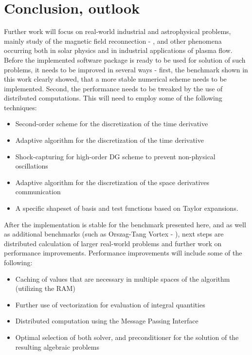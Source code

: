 \chapter{Conclusion, outlook}
Further work will focus on real-world industrial and astrophysical problems, mainly study of the magnetic field reconnection - \citep{reconnection}, and other phenomena occurring both in solar physics and in industrial applications of plasma flow.
Before the implemented software package is ready to be used for solution of such problems, it needs to be improved in several ways - first, the benchmark shown in this work clearly showed, that a more stable numerical scheme needs to be implemented. Second, the performance needs to be tweaked by the use of distributed computations. This will need to employ some of the following techniques:
\begin{itemize}
	\item Second-order scheme for the discretization of the time derivative
	\item Adaptive algorithm for the discretization of the time derivative
	\item Shock-capturing for high-order DG scheme to prevent non-physical oscillations
	\item Adaptive algorithm for the discretization of the space derivatives communication
	\item A specific shapeset of basis and test functions based on Taylor expansions.
\end{itemize}

After the implementation is stable for the benchmark presented here, and as well as additional benchmarks (such as Orszag-Tang Vortex - \citep{vortex}), next steps are distributed calculation of larger real-world problems and further work on performance improvements. Performance improvements will include some of the following:
\begin{itemize}
	\item Caching of values that are necessary in multiple spaces of the algorithm (utilizing the RAM)
	\item Further use of vectorization for evaluation of integral quantities
	\item Distributed computation using the Message Passing Interface
	\item Optimal selection of both solver, and preconditioner for the solution of the resulting algebraic problems
\end{itemize}

